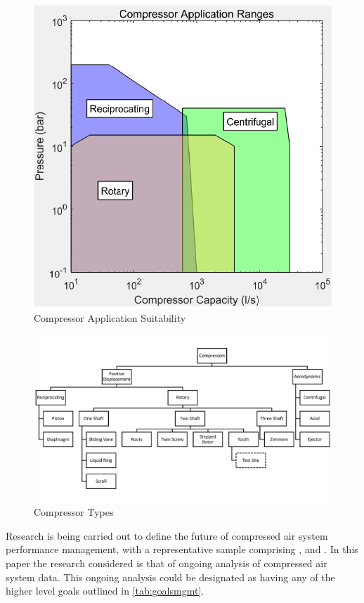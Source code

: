 \begin{figure}
\includegraphics[width = 0.5\columnwidth]{./Images/CompApps.pdf}
\caption{Compressor Application Suitability}
\label{fig:CompApps}
\end{figure}

\begin{figure}
\includegraphics[width = \textwidth]{./Images/CompressorClassification.pdf}
\caption{Compressor Types}
\label{fig:comptypes}
\end{figure}


Research is being carried out to define the future of compressed air system performance management, with a representative sample comprising \cite{DapengNiu2011}, \cite{Ren2012} and \cite{Kopanos2015}. In this paper the research considered is that of ongoing analysis of compressed air system data. This ongoing analysis could be designated as having any of the higher level goals outlined in \autoref{tab:goalsmgmt}.

